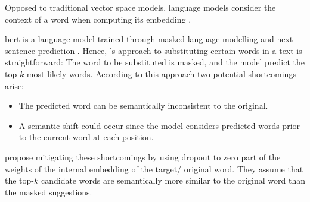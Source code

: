 Opposed to traditional vector space models, language models consider the context of a word when computing its embedding \cite{emmery_adversarial_2021}.


\ac{bert} is a language model trained through masked language modelling and next-sentence prediction \cite{emmery_adversarial_2021}.
Hence, \citet{emmery_adversarial_2021}'s approach to substituting certain words in a text is straightforward:
The word to be substituted is masked, and the model predict the top-$k$ most likely words.
According to this approach two potential shortcomings arise:
\begin{itemize}
    \item The predicted word can be semantically inconsistent to the original.
    \item A semantic shift could occur since the model considers predicted words prior to the current word at each position.
\end{itemize}
\citet{emmery_adversarial_2021} propose mitigating these shortcomings by using dropout to zero part of the weights of the internal embedding of the target/ original word.
They assume that the top-$k$ candidate words are semantically more similar to the original word than the masked suggestions.